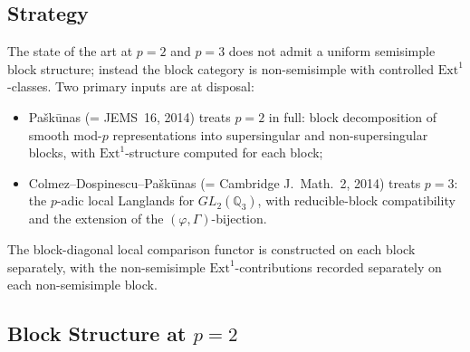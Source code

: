 \subsection{Strategy}

The state of the art at \(p=2\) and \(p=3\) does not admit a uniform
semisimple block structure; instead the block category is
non-semisimple with controlled \(\mathrm{Ext}^{1}\)-classes. Two
primary inputs are at disposal:
\begin{itemize}
\item Pa{\v s}k{\=u}nas (= JEMS~16, 2014) treats
\(p=2\) in full: block decomposition of smooth mod-\(p\) representations
into supersingular and non-supersingular blocks, with
\(\mathrm{Ext}^{1}\)-structure computed for each block;
\item Colmez--Dospinescu--Pa{\v s}k{\=u}nas
(= Cambridge J.~Math.~2, 2014) treats \(p=3\): the
\(p\)-adic local Langlands for \(GL_{2}(\mathbb{Q}_{3})\), with
reducible-block compatibility and the extension of the
\((\varphi,\Gamma)\)-bijection.
\end{itemize}

The block-diagonal local comparison functor is constructed on each
block separately, with the non-semisimple
\(\mathrm{Ext}^{1}\)-contributions recorded separately on each
non-semisimple block.

\subsection{Block Structure at \(p=2\)}

